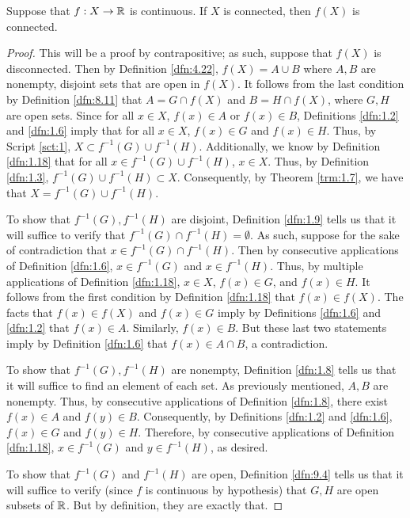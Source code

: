 \documentclass[../main.tex]{subfiles}
\begin{document}
\begin{theorem}\label{trm:9.11}
    Suppose that $f:X\to\mathbb{R}$ is continuous. If $X$ is connected, then $f(X)$ is connected.
    \begin{proof}
        This will be a proof by contrapositive; as such, suppose that $f(X)$ is disconnected. Then by Definition \ref{dfn:4.22}, $f(X)=A\cup B$ where $A,B$ are nonempty, disjoint sets that are open in $f(X)$. It follows from the last condition by Definition \ref{dfn:8.11} that $A=G\cap f(X)$ and $B=H\cap f(X)$, where $G,H$ are open sets. Since for all $x\in X$, $f(x)\in A$ or $f(x)\in B$, Definitions \ref{dfn:1.2} and \ref{dfn:1.6} imply that for all $x\in X$, $f(x)\in G$ and $f(x)\in H$. Thus, by Script \ref{sct:1}, $X\subset f^{-1}(G)\cup f^{-1}(H)$. Additionally, we know by Definition \ref{dfn:1.18} that for all $x\in f^{-1}(G)\cup f^{-1}(H)$, $x\in X$. Thus, by Definition \ref{dfn:1.3}, $f^{-1}(G)\cup f^{-1}(H)\subset X$. Consequently, by Theorem \ref{trm:1.7}, we have that $X=f^{-1}(G)\cup f^{-1}(H)$.\par\smallskip
        To show that $f^{-1}(G),f^{-1}(H)$ are disjoint, Definition \ref{dfn:1.9} tells us that it will suffice to verify that $f^{-1}(G)\cap f^{-1}(H)=\emptyset$. As such, suppose for the sake of contradiction that $x\in f^{-1}(G)\cap f^{-1}(H)$. Then by consecutive applications of Definition \ref{dfn:1.6}, $x\in f^{-1}(G)$ and $x\in f^{-1}(H)$. Thus, by multiple applications of Definition \ref{dfn:1.18}, $x\in X$, $f(x)\in G$, and $f(x)\in H$. It follows from the first condition by Definition \ref{dfn:1.18} that $f(x)\in f(X)$. The facts that $f(x)\in f(X)$ and $f(x)\in G$ imply by Definitions \ref{dfn:1.6} and \ref{dfn:1.2} that $f(x)\in A$. Similarly, $f(x)\in B$. But these last two statements imply by Definition \ref{dfn:1.6} that $f(x)\in A\cap B$, a contradiction.\par
        To show that $f^{-1}(G),f^{-1}(H)$ are nonempty, Definition \ref{dfn:1.8} tells us that it will suffice to find an element of each set. As previously mentioned, $A,B$ are nonempty. Thus, by consecutive applications of Definition \ref{dfn:1.8}, there exist $f(x)\in A$ and $f(y)\in B$. Consequently, by Definitions \ref{dfn:1.2} and \ref{dfn:1.6}, $f(x)\in G$ and $f(y)\in H$. Therefore, by consecutive applications of Definition \ref{dfn:1.18}, $x\in f^{-1}(G)$ and $y\in f^{-1}(H)$, as desired.\par
        To show that $f^{-1}(G)$ and $f^{-1}(H)$ are open, Definition \ref{dfn:9.4} tells us that it will suffice to verify (since $f$ is continuous by hypothesis) that $G,H$ are open subsets of $\mathbb{R}$. But by definition, they are exactly that.
    \end{proof}
\end{theorem}
\end{document}
